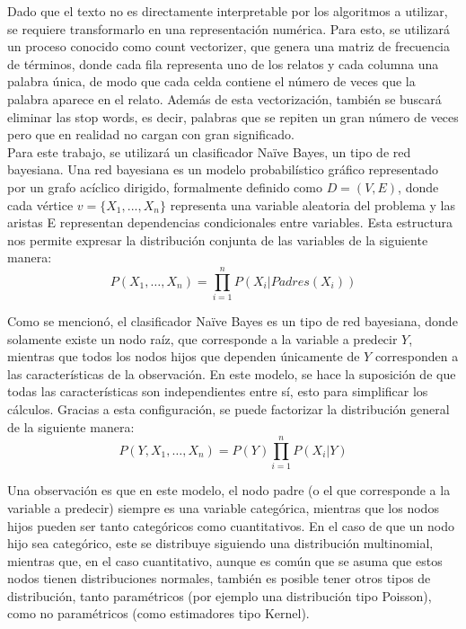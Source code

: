 \documentclass[12pt, letterpaper]{report}
\begin{document}
Dado que el texto no es directamente interpretable por los algoritmos a utilizar, se requiere transformarlo en una representación numérica. Para esto, se utilizará un proceso conocido como count vectorizer, que genera una matriz de frecuencia de términos, donde cada fila representa uno de los relatos y cada columna una palabra única, de modo que cada celda contiene el número de veces que la palabra aparece en el relato. Además de esta vectorización, también se buscará eliminar las stop words, es decir, palabras que se repiten un gran número de veces pero que en realidad no cargan con gran significado.
\\

Para este trabajo, se utilizará un clasificador Naïve Bayes, un tipo de red bayesiana. Una red bayesiana es un modelo probabilístico gráfico representado por un grafo acíclico dirigido, formalmente definido como $D=(V, E)$, donde cada vértice $v=\{ X_1, ..., X_n\}$ representa una variable aleatoria del problema y las aristas E representan dependencias condicionales entre variables. Esta estructura nos permite expresar la distribución conjunta de las variables de la siguiente manera:
\begin{equation*}
    P(X_1,\ldots ,X_n)=\prod_{i=1}^n P(X_i|Padres(X_i))
\end{equation*}

Como se mencionó, el clasificador Naïve Bayes es un tipo de red bayesiana, donde solamente existe un nodo raíz, que corresponde a la variable a predecir $Y$, mientras que todos los nodos hijos que dependen únicamente de $Y$ corresponden a las características de la observación. En este modelo, se hace la suposición de que todas las características son independientes entre sí, esto para simplificar los cálculos. Gracias a esta configuración, se puede factorizar la distribución general de la siguiente manera:
\begin{equation*}
    P(Y,X_1,\ldots ,X_n)=P(Y)\prod_{i=1}^n P(X_i|Y)
\end{equation*}

Una observación es que en este modelo, el nodo padre (o el que corresponde a la variable a predecir) siempre es una variable categórica, mientras que los nodos hijos pueden ser tanto categóricos como cuantitativos. En el caso de que un nodo hijo sea categórico, este se distribuye siguiendo una distribución multinomial, mientras que, en el caso cuantitativo, aunque es común que se asuma que estos nodos tienen distribuciones normales, también es posible tener otros tipos de distribución, tanto paramétricos (por ejemplo una distribución tipo Poisson), como no paramétricos (como estimadores tipo Kernel).
\\
\end{document}
